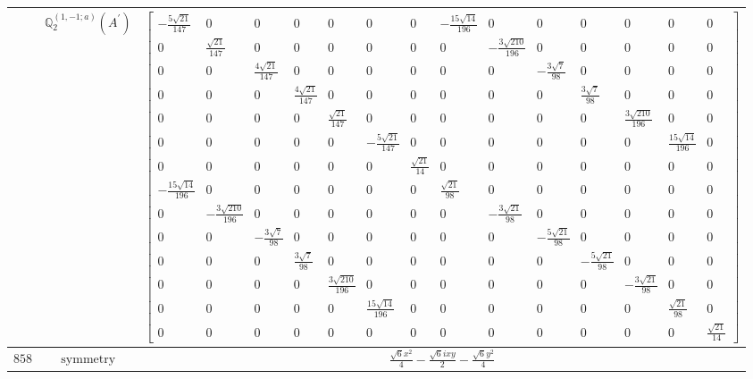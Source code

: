 \documentclass[fleqn,8pt,landscape]{jsarticle}
\begin{document}
\begin{longtable}{ccc}
$  $ & $ \mathbb{Q}_{2}^{(1,-1;a)}(A^{\prime}) $ & $ \begin{bmatrix} - \frac{5 \sqrt{21}}{147} & 0 & 0 & 0 & 0 & 0 & 0 & - \frac{15 \sqrt{14}}{196} & 0 & 0 & 0 & 0 & 0 & 0 \\ 0 & \frac{\sqrt{21}}{147} & 0 & 0 & 0 & 0 & 0 & 0 & - \frac{3 \sqrt{210}}{196} & 0 & 0 & 0 & 0 & 0 \\ 0 & 0 & \frac{4 \sqrt{21}}{147} & 0 & 0 & 0 & 0 & 0 & 0 & - \frac{3 \sqrt{7}}{98} & 0 & 0 & 0 & 0 \\ 0 & 0 & 0 & \frac{4 \sqrt{21}}{147} & 0 & 0 & 0 & 0 & 0 & 0 & \frac{3 \sqrt{7}}{98} & 0 & 0 & 0 \\ 0 & 0 & 0 & 0 & \frac{\sqrt{21}}{147} & 0 & 0 & 0 & 0 & 0 & 0 & \frac{3 \sqrt{210}}{196} & 0 & 0 \\ 0 & 0 & 0 & 0 & 0 & - \frac{5 \sqrt{21}}{147} & 0 & 0 & 0 & 0 & 0 & 0 & \frac{15 \sqrt{14}}{196} & 0 \\ 0 & 0 & 0 & 0 & 0 & 0 & \frac{\sqrt{21}}{14} & 0 & 0 & 0 & 0 & 0 & 0 & 0 \\ - \frac{15 \sqrt{14}}{196} & 0 & 0 & 0 & 0 & 0 & 0 & \frac{\sqrt{21}}{98} & 0 & 0 & 0 & 0 & 0 & 0 \\ 0 & - \frac{3 \sqrt{210}}{196} & 0 & 0 & 0 & 0 & 0 & 0 & - \frac{3 \sqrt{21}}{98} & 0 & 0 & 0 & 0 & 0 \\ 0 & 0 & - \frac{3 \sqrt{7}}{98} & 0 & 0 & 0 & 0 & 0 & 0 & - \frac{5 \sqrt{21}}{98} & 0 & 0 & 0 & 0 \\ 0 & 0 & 0 & \frac{3 \sqrt{7}}{98} & 0 & 0 & 0 & 0 & 0 & 0 & - \frac{5 \sqrt{21}}{98} & 0 & 0 & 0 \\ 0 & 0 & 0 & 0 & \frac{3 \sqrt{210}}{196} & 0 & 0 & 0 & 0 & 0 & 0 & - \frac{3 \sqrt{21}}{98} & 0 & 0 \\ 0 & 0 & 0 & 0 & 0 & \frac{15 \sqrt{14}}{196} & 0 & 0 & 0 & 0 & 0 & 0 & \frac{\sqrt{21}}{98} & 0 \\ 0 & 0 & 0 & 0 & 0 & 0 & 0 & 0 & 0 & 0 & 0 & 0 & 0 & \frac{\sqrt{21}}{14} \end{bmatrix} $ \\ \hline
$ 858 $ & $ \text{symmetry} $ & $ \frac{\sqrt{6} x^{2}}{4} - \frac{\sqrt{6} i x y}{2} - \frac{\sqrt{6} y^{2}}{4} $ \\

\end{longtable}
\end{document}
